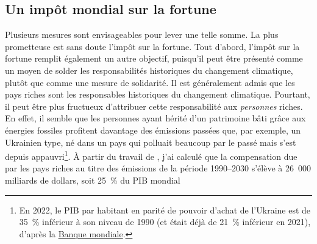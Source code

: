 \documentclass[a5paper,french,openany]{memoir}
\begin{document}
\subsection{Un impôt mondial sur la fortune} %
Plusieurs mesures sont envisageables pour lever une telle somme. La plus prometteuse est sans doute l'impôt sur la fortune. Tout d'abord, l'impôt sur la fortune remplit également un autre objectif, puisqu'il peut être présenté comme un moyen de solder 
les responsabilités historiques du changement climatique, plutôt que comme une mesure de solidarité. Il est généralement admis que les pays riches sont les responsables historiques du changement climatique. Pourtant, il peut être plus fructueux d'attribuer cette responsabilité aux \textit{personnes} riches. En effet, il semble que les personnes ayant hérité d'un patrimoine bâti grâce aux énergies fossiles profitent davantage des émissions passées que, par exemple, un Ukrainien type, né dans un pays qui polluait beaucoup par le passé mais s'est depuis appauvri\footnote{En 2022, le PIB par habitant en parité de pouvoir d'achat de l'Ukraine est de 35~\% inférieur à son niveau de 1990 (et était déjà de 21~\% inférieur en 2021), d'après la \href{https://data.worldbank.org/indicator/NY.GDP.PCAP.PP.KD?locations=UA}{Banque mondiale}.}. %
À partir du travail de \cite{fanning_compensation_2023}, j'ai calculé que la compensation due par les pays riches au titre des émissions de la période 1990--2030 s'élève à 26~000 milliards de dollars, soit 25~\% du PIB mondial
\end{document}
